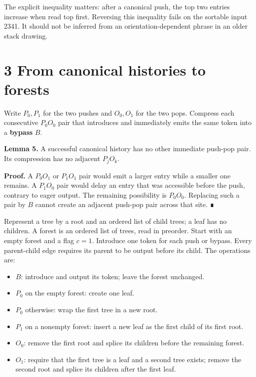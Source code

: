 \documentclass[11pt,letterpaper]{article}
\providecommand{\tightlist}{\setlength{\itemsep}{0pt}\setlength{\parskip}{0pt}}
\begin{document}
The explicit inequality matters: after a canonical push, the top two
entries increase when read top first. Reversing this inequality fails on
the sortable input 2341. It should not be inferred from an
orientation-dependent phrase in an older stack drawing.

\section{3 From canonical histories to
forests}\label{from-canonical-histories-to-forests}

Write \(P_0,P_1\) for the two pushes and \(O_0,O_1\) for the two pops.
Compress each consecutive \(P_0O_0\) pair that introduces and
immediately emits the same token into a \textbf{bypass} \(B\).

\textbf{Lemma 5.} A successful canonical history has no other immediate
push-pop pair. Its compression has no adjacent \(P_jO_k\).

\textbf{Proof.} A \(P_0O_1\) or \(P_1O_1\) pair would emit a larger
entry while a smaller one remains. A \(P_1O_0\) pair would delay an
entry that was accessible before the push, contrary to eager output. The
remaining possibility is \(P_0O_0\). Replacing such a pair by \(B\)
cannot create an adjacent push-pop pair across that site. ∎

Represent a tree by a root and an ordered list of child trees; a leaf
has no children. A forest is an ordered list of trees, read in preorder.
Start with an empty forest and a flag \(c=1\). Introduce one token for
each push or bypass. Every parent-child edge requires its parent to be
output before its child. The operations are:

\begin{itemize}
\tightlist
\item
  \(B\): introduce and output its token; leave the forest unchanged.
\item
  \(P_0\) on the empty forest: create one leaf.
\item
  \(P_0\) otherwise: wrap the first tree in a new root.
\item
  \(P_1\) on a nonempty forest: insert a new leaf as the first child of
  its first root.
\item
  \(O_0\): remove the first root and splice its children before the
  remaining forest.
\item
  \(O_1\): require that the first tree is a leaf and a second tree
  exists; remove the second root and splice its children after the first
  leaf.
\end{itemize}
\end{document}

